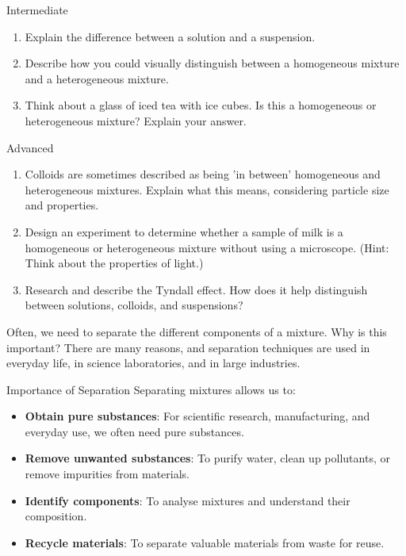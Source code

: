 \begin{tieredquestions}{Intermediate}
\begin{enumerate}
    \item Explain the difference between a solution and a suspension.
    \item Describe how you could visually distinguish between a homogeneous mixture and a heterogeneous mixture.
    \item  Think about a glass of iced tea with ice cubes. Is this a homogeneous or heterogeneous mixture? Explain your answer.
\end{enumerate}
\end{tieredquestions}

\begin{tieredquestions}{Advanced}
\begin{enumerate}
    \item  Colloids are sometimes described as being 'in between' homogeneous and heterogeneous mixtures. Explain what this means, considering particle size and properties.
    \item  Design an experiment to determine whether a sample of milk is a homogeneous or heterogeneous mixture without using a microscope. (Hint: Think about the properties of light.)
    \item  Research and describe the Tyndall effect. How does it help distinguish between solutions, colloids, and suspensions?
\end{enumerate}
\end{tieredquestions}


\FloatBarrier
\1


Often, we need to separate the different components of a mixture.  Why is this important? There are many reasons, and separation techniques are used in everyday life, in science laboratories, and in large industries.

\begin{keyconcept}{Importance of Separation}
Separating mixtures allows us to:
\begin{itemize}
    \item \textbf{Obtain pure substances}:  For scientific research, manufacturing, and everyday use, we often need pure substances.
    \item \textbf{Remove unwanted substances}:  To purify water, clean up pollutants, or remove impurities from materials.
    \item \textbf{Identify components}:  To analyse mixtures and understand their composition.
    \item \textbf{Recycle materials}: To separate valuable materials from waste for reuse.
\end{itemize}
\end{keyconcept}

